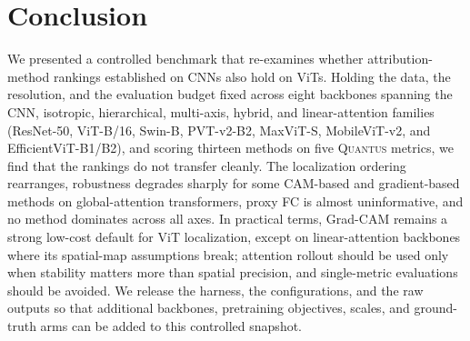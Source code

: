 \documentclass[final,5p,times,twocolumn]{elsarticle}
\begin{document}
\section{Conclusion}
\label{sec:conclusion}
We presented a controlled benchmark that re-examines whether attribution-method
rankings established on CNNs also hold on ViTs. Holding the data,
the resolution, and the evaluation budget fixed across eight backbones spanning
the CNN, isotropic, hierarchical, multi-axis, hybrid, and linear-attention
families (ResNet-50, ViT-B/16, Swin-B, PVT-v2-B2, MaxViT-S, MobileViT-v2, and
EfficientViT-B1/B2), and scoring thirteen methods on five \textsc{Quantus} metrics,
we find that the rankings do not transfer cleanly. The
localization ordering rearranges, robustness degrades sharply for some CAM-based and
gradient-based methods on global-attention transformers, proxy FC is almost
uninformative, and no method dominates across all axes. In practical terms,
Grad-CAM remains a strong low-cost default for ViT localization, except on
linear-attention backbones where its spatial-map
assumptions break; attention
rollout should be used only when stability matters more than spatial precision,
and single-metric evaluations should be avoided. We release the harness, the
configurations, and the raw outputs so that additional backbones, pretraining
objectives, scales, and ground-truth arms can be added to this controlled
snapshot.


\FloatBarrier


\end{document}
